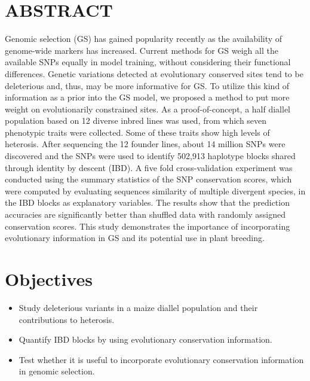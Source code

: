 \documentclass[a0,portrait]{a0poster}
\begin{document}
\begin{multicols}{2} %


\color{Navy} %

\section*{ABSTRACT}
Genomic selection (GS) has gained popularity recently as the availability of genome-wide markers has increased. Current methods for GS weigh all the available SNPs equally in model training, without considering their functional differences. Genetic variations detected at evolutionary conserved sites tend to be deleterious and, thus, may be more informative for GS. To utilize this kind of information as a prior into the GS model, we proposed a method to put more weight on evolutionarily constrained sites. As a proof-of-concept, a half diallel population based on 12 diverse inbred lines was used, from which seven phenotypic traits were collected. Some of these traits show high levels of heterosis. After sequencing the 12 founder lines, about 14 million SNPs were discovered and the SNPs were used to identify 502,913 haplotype blocks shared through identity by descent (IBD). A five fold cross-validation experiment was conducted using the summary statistics of the SNP conservation scores, which were computed by evaluating sequences similarity of multiple divergent species, in the IBD blocks as explanatory variables. The results show that the prediction accuracies are significantly better than shuffled data with randomly assigned conservation scores. This study demonstrates the importance of incorporating evolutionary information in GS and its potential use in plant breeding.



\color{SaddleBrown} %

\section*{Objectives}
\begin{itemize}
\item Study deleterious variants in a maize diallel population and their contributions to heterosis.
\item Quantify IBD blocks by using evolutionary conservation information.
\item Test whether it is useful to incorporate evolutionary conservation information in genomic selection.
\end{itemize}


\end{multicols}
\end{document}
